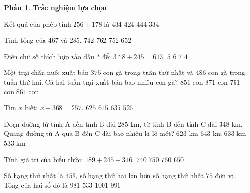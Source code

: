 \textbf{Phần 1. Trắc nghiệm lựa chọn}

\begin{ex} %
Kết quả của phép tính $256 + 178$ là
\choice
{\True $434$}
{$424$}
{$444$}
{$334$}
\end{ex}

\begin{ex} %
Tính tổng của $467$ và $285$.
\choice
{$742$}
{$762$}
{\True $752$}
{$652$}
\end{ex}

\begin{ex} %
Điền chữ số thích hợp vào dấu $*$ để: $3*8 + 245 = 613$.
\choice
{$5$}
{\True $6$}
{$7$}
{$4$}
\end{ex}

\begin{ex} %
Một trại chăn nuôi xuất bán $375$ con gà trong tuần thứ nhất và $486$ con gà trong tuần thứ hai. Cả hai tuần trại xuất bán bao nhiêu con gà?
\choice
{$851$ con}
{$871$ con}
{$761$ con}
{\True $861$ con}
\end{ex}

\begin{ex} %
Tìm $x$ biết: $x - 368 = 257$.
\choice
{\True $625$}
{$615$}
{$635$}
{$525$}
\end{ex}

\begin{ex} %
Đoạn đường từ tỉnh A đến tỉnh B dài $285\text{ km}$, từ tỉnh B đến tỉnh C dài $348\text{ km}$. Quãng đường từ A qua B đến C dài bao nhiêu ki-lô-mét?
\choice
{$623\text{ km}$}
{$643\text{ km}$}
{\True $633\text{ km}$}
{$533\text{ km}$}
\end{ex}

\begin{ex} %
Tính giá trị của biểu thức: $189 + 245 + 316$.
\choice
{$740$}
{\True $750$}
{$760$}
{$650$}
\end{ex}

\begin{ex} %
Số hạng thứ nhất là $458$, số hạng thứ hai lớn hơn số hạng thứ nhất $75$ đơn vị. Tổng của hai số đó là
\choice
{$981$}
{$533$}
{$1 001$}
{\True $991$}
\end{ex}

